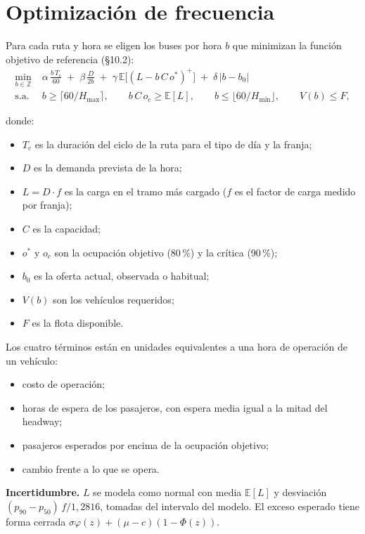 \documentclass[10pt,a4paper]{article}
\begin{document}
\section{Optimización de frecuencia}

Para cada ruta y hora se eligen los buses por hora $b$ que minimizan la función objetivo de referencia (§10.2):
\begin{align*}
\min_{b \in \mathbb{Z}}\; & \alpha\, \frac{b\,T_c}{60} \;+\; \beta\, \frac{D}{2b} \;+\; \gamma\, \mathbb{E}\big[(L - b\,C\,o^{*})^{+}\big] \;+\; \delta\, |b - b_0| \\
\text{s.a.}\; & b \ge \lceil 60/H_{\max} \rceil, \qquad b\,C\,o_{c} \ge \mathbb{E}[L], \qquad b \le \lfloor 60/H_{\min} \rfloor, \qquad V(b) \le F,
\end{align*}

donde:

\begin{itemize}
  \item $T_c$ es la duración del ciclo de la ruta para el tipo de día y la franja;
  \item $D$ es la demanda prevista de la hora;
  \item $L = D \cdot f$ es la carga en el tramo más cargado ($f$ es el factor de carga medido por franja);
  \item $C$ es la capacidad;
  \item $o^{*}$ y $o_c$ son la ocupación objetivo (80\,\%) y la crítica (90\,\%);
  \item $b_0$ es la oferta actual, observada o habitual;
  \item $V(b)$ son los vehículos requeridos;
  \item $F$ es la flota disponible.
\end{itemize}

Los cuatro términos están en unidades equivalentes a una hora de operación de un vehículo:

\begin{itemize}
  \item costo de operación;
  \item horas de espera de los pasajeros, con espera media igual a la mitad del headway;
  \item pasajeros esperados por encima de la ocupación objetivo;
  \item cambio frente a lo que se opera.
\end{itemize}

\textbf{Incertidumbre.} $L$ se modela como normal con media $\mathbb{E}[L]$ y desviación $(p_{90} - p_{50})\,f / 1{,}2816$, tomadas del intervalo del modelo. El exceso esperado tiene forma cerrada $\sigma\varphi(z) + (\mu - c)(1 - \Phi(z))$.
\end{document}
